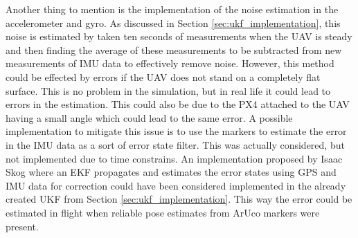 \documentclass[../Head/report.tex]{subfiles}
\begin{document}
Another thing to mention is the implementation of the noise estimation in the accelerometer and gyro. As discussed in Section \ref{sec:ukf_implementation}, this noise is estimated by taken ten seconds of measurements when the UAV is steady and then finding the average of these measurements to be subtracted from new measurements of IMU data to effectively remove noise. However, this method could be effected by errors if the UAV does not stand on a completely flat surface. This is no problem in the simulation, but in real life it could lead to errors in the estimation. This could also be due to the PX4 attached to the UAV having a small angle which could lead to the same error. A possible implementation to mitigate this issue is to use the markers to estimate the error in the IMU data as a sort of error state filter. This was actually considered, but not implemented due to time constrains. An implementation proposed by Isaac Skog \cite{GNSSaidedINS} where an EKF propagates and estimates the error states using GPS and IMU data for correction could have been considered implemented in the already created UKF from Section \ref{sec:ukf_implementation}. This way the error could be estimated in flight when reliable pose estimates from ArUco markers were present.    
\end{document}

